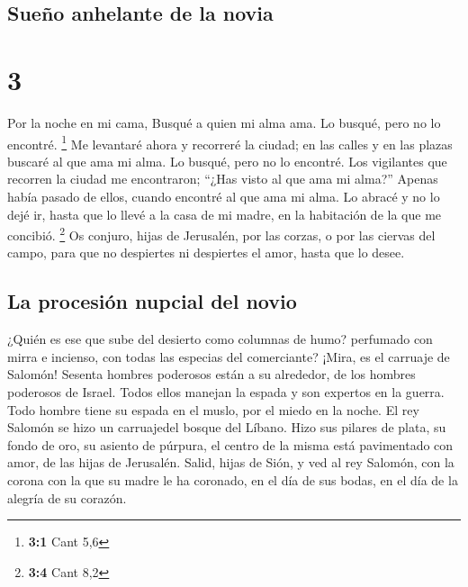 \begin{paracol}{2}
{\subsection{Sueño anhelante de la
novia}\label{sueuxf1o-anhelante-de-la-novia}}

\hypertarget{section-4}{%
\section{3}\label{section-4}}

 Por la noche en mi cama, Busqué a quien mi alma ama. Lo
busqué, pero no lo encontré. \footnote{\textbf{3:1} Cant 5,6}
 Me levantaré ahora y recorreré la ciudad; en las calles y
en las plazas buscaré al que ama mi alma. Lo busqué, pero no lo
encontré.  Los vigilantes que recorren la ciudad me
encontraron; ``¿Has visto al que ama mi alma?''  Apenas
había pasado de ellos, cuando encontré al que ama mi alma. Lo abracé y
no lo dejé ir, hasta que lo llevé a la casa de mi madre, en la
habitación de la que me concibió. \footnote{\textbf{3:4} Cant 8,2}
 Os conjuro, hijas de Jerusalén, por las corzas, o por las
ciervas del campo, para que no despiertes ni despiertes el amor, hasta
que lo desee.

\hypertarget{la-procesiuxf3n-nupcial-del-novio}{%
\subsection{La procesión nupcial del
novio}\label{la-procesiuxf3n-nupcial-del-novio}}

 ¿Quién es ese que sube del desierto como columnas de
humo? perfumado con mirra e incienso, con todas las especias del
comerciante?  ¡Mira, es el carruaje de Salomón! Sesenta
hombres poderosos están a su alrededor, de los hombres poderosos de
Israel.  Todos ellos manejan la espada y son expertos en
la guerra. Todo hombre tiene su espada en el muslo, por el miedo en la
noche.  El rey Salomón se hizo un carruajedel bosque del
Líbano.  Hizo sus pilares de plata, su fondo de oro, su
asiento de púrpura, el centro de la misma está pavimentado con amor, de
las hijas de Jerusalén.  Salid, hijas de Sión, y ved al
rey Salomón, con la corona con la que su madre le ha coronado, en el día
de sus bodas, en el día de la alegría de su corazón.

\switchcolumn
\begin{otherlanguage}{english}


\end{otherlanguage}
\end{paracol}
